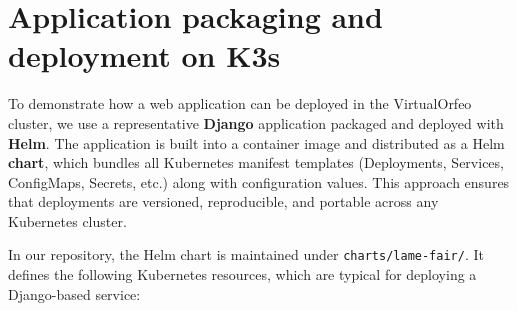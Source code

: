 
\section{Application packaging and deployment on K3s}

To demonstrate how a web application can be deployed in the VirtualOrfeo cluster, 
we use a representative \textbf{Django} application packaged and deployed with 
\textbf{Helm}. The application is built into a container image and distributed 
as a Helm \textbf{chart}, which bundles all Kubernetes manifest templates 
(Deployments, Services, ConfigMaps, Secrets, etc.) along with configuration 
values. This approach ensures that deployments are versioned, reproducible, and 
portable across any Kubernetes cluster.

\medskip

In our repository, the Helm chart is maintained under \texttt{charts/lame-fair/}. 
It defines the following Kubernetes resources, which are typical for deploying a 
Django-based service:  

